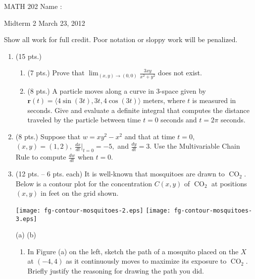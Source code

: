 \documentclass{report}
\newcommand\dsp{\displaystyle}
\newcommand\cotwo{$\operatorname{CO}_2$\xspace}
\begin{document}
%

\noindent MATH 202 \hfill Name :\underbar{\ \ \ \ \ \ \ \ \ \ \ \ \
\ \ \ \ \ \ \ \ \ \ \ \ \ \ \ \ \ \ \ \ \ \ \ \ \ \ \ \ \ \ \ \ \ \
\ }

\noindent Midterm 2 \hfill March 23, 2012

\bigskip

  Show all work for full credit.  Poor notation or sloppy work will
be penalized.

\begin{enumerate}

\item (15 pts.) 

\begin{enumerate}

\item (7 pts.) Prove that $\dsp \lim_{(x,y) \to (0,0)} \frac{3xy}{x^2+y^2}$ does not exist.

\vskip 7cm

\item (8 pts.) A particle moves along a curve in $3$-space given by 
$\mathbf r (t) = \langle 4 \sin(3t), 3t, 4 \cos(3t) \rangle$ meters, 
where $t$ is measured in seconds.
Give and evaluate a definite integral that computes the distance traveled by the particle between 
time $t = 0$ seconds and $t = 2\pi$ seconds. 

\end{enumerate}


\newpage


\item (8 pts.) Suppose that $w = xy^2 - x^2$ and that at time $t=0$, 
$(x,y) = (1,2), \; \frac{dx}{dt} \big\vert_{t=0} = -5,$ and $\frac{dy}{dt} = 3$.
Use the Multivariable Chain Rule to compute $\dsp \frac{dw}{dt}$ when $t = 0$.

\vskip 6cm

\item (12 pts. -- 6 pts. each)  It is well-known that mosquitoes are drawn to \cotwo.  
Below is a contour plot for the concentration $C(x,y)$ of \cotwo 
at positions $(x,y)$ in feet on the grid shown.  

\texttt{[image: fg-contour-mosquitoes-2.eps]} \hskip 1.5cm \texttt{[image: fg-contour-mosquitoes-3.eps]}

\centerline{(a) \hskip 7.8cm (b)}

\begin{enumerate}

\item In Figure (a) on the left, sketch the path
of a mosquito placed on the $X$ at $(-4,4)$ as it continuously moves
to maximize its exposure to \cotwo.  Briefly justify the reasoning for
drawing the path you did.


\end{enumerate}
\end{enumerate}
\end{document}
